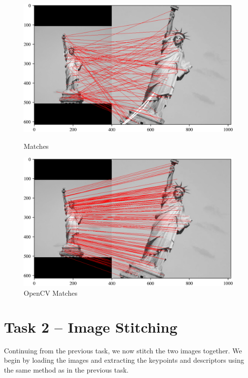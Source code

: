 \documentclass[11pt,a4paper]{article}
\begin{document}
\begin{figure}[ht!]
  \centering
  \begin{minipage}{0.45\textwidth}
    \centering
    \includegraphics[width=\textwidth]{figs/matches.png} %
    \caption{Matches}
  \end{minipage}
  \quad
  \begin{minipage}{0.45\textwidth}
    \centering
    \includegraphics[width=\textwidth]{figs/opencv_matches.png} %
    \caption{OpenCV Matches}
  \end{minipage}
\end{figure}

\newpage
\section{Task 2 -- Image Stitching}

Continuing from the previous task, we now stitch the two images together. We begin by loading the images and extracting the keypoints and descriptors using the same method as in the previous task.
\end{document}
